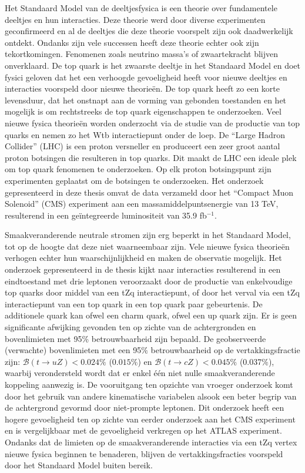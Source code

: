 \chapterprecishere{\Titledutch}
Het Standaard Model van de deeltjesfysica is een theorie over fundamentele deeltjes en hun interacties. Deze theorie werd door diverse experimenten geconfirmeerd en al de deeltjes die deze theorie voorspelt zijn ook daadwerkelijk ontdekt. Ondanks zijn vele successen heeft deze theorie echter ook zijn tekortkomingen. Fenomenen zoals neutrino massa's of zwaartekracht blijven onverklaard. De top quark is het zwaarste deeltje in het Standaard Model en doet fysici geloven dat het een verhoogde gevoeligheid heeft voor nieuwe deeltjes en interacties voorspeld door nieuwe theorie\"en. De top quark heeft zo een korte levensduur, dat het onstnapt aan de vorming van gebonden toestanden en het mogelijk is om rechtstreeks de top quark eigenschappen te onderzoeken. 
Veel nieuwe fysica theorie\"en worden onderzocht  via de studie van de productie van top quarks en nemen zo het Wtb interactiepunt onder de loep. De  ``Large Hadron Collider'' (LHC) is een proton versneller en produceert een zeer groot aantal proton botsingen die resulteren in top quarks.  Dit maakt de LHC een ideale plek om top quark fenomenen te onderzoeken. Op elk proton 
botsingspunt zijn experimenten geplaatst om de botsingen te onderzoeken.  Het onderzoek gepresenteerd in deze thesis omvat de data verzameld door het ``Compact Muon Solenoid'' (CMS) experiment aan een massamiddelpuntsenergie van  13 TeV, resulterend in een ge\"integreerde luminositeit van 35.9 fb$^{-1}$. 


Smaakveranderende neutrale stromen zijn erg beperkt in het Standaard Model, tot op de hoogte dat deze niet waarneembaar zijn. Vele nieuwe fysica theorie\"en verhogen echter hun waarschijnlijkheid en maken de observatie mogelijk. Het onderzoek gepresenteerd in de thesis kijkt naar interacties resulterend in een eindtoestand met drie leptonen veroorzaakt door de productie van enkelvoudige top quarks door middel van een tZq interactiepunt, of door het verval via een tZq interactiepunt van een top quark in een top quark paar gebeurtenis. De additionele quark kan ofwel een charm quark, ofwel een up quark zijn. Er is geen significante afwijking gevonden ten op zichte van de achtergronden en bovenlimieten met 95\% betrouwbaarheid zijn bepaald. De geobserveerde (verwachte) bovenlimieten met een 95$\%$ betrouwbaarheid op de vertakkingsfractie zijn: ${\mathcal{B}}(t \rightarrow uZ) < 0.024\%$ ($0.015\%$) en ${\mathcal{B}}(t \rightarrow cZ) < 0.045\%$ (0.037$\%$), waarbij verondersteld wordt dat er enkel \'e\'en niet nulle smaakveranderende koppeling aanwezig is. \newpage
\thispagestyle{empty}
De vooruitgang ten opzichte van vroeger onderzoek komt door het gebruik van andere kinematische variabelen alsook  een beter begrip van de achtergrond gevormd door niet-prompte leptonen.  Dit onderzoek heeft een  hogere gevoeligheid ten op zichte van eerder onderzoek aan het CMS experiment en is vergelijkbaar met de gevoeligheid verkregen op het ATLAS experiment. Ondanks dat 
de limieten op de smaakveranderende interacties via een tZq vertex nieuwe fysica beginnen te benaderen, blijven de vertakkingsfracties voorspeld door het Standaard Model buiten bereik. 